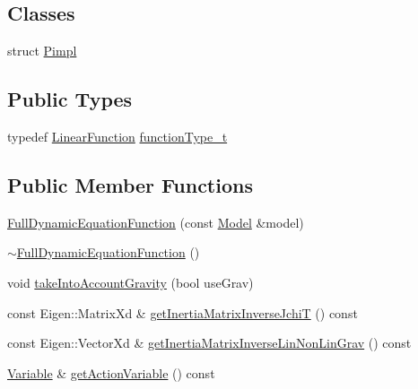\subsection*{Classes}
\begin{DoxyCompactItemize}
\item 
struct \hyperlink{structFullDynamicEquationFunction_1_1Pimpl}{Pimpl}
\end{DoxyCompactItemize}
\subsection*{Public Types}
\begin{DoxyCompactItemize}
\item 
typedef \hyperlink{classocra_1_1LinearFunction}{Linear\+Function} \hyperlink{group__constraint_ga3f72eb3c4529d2c19ef39928f5e57262}{function\+Type\+\_\+t}
\end{DoxyCompactItemize}
\subsection*{Public Member Functions}
\begin{DoxyCompactItemize}
\item 
\hyperlink{group__constraint_ga778bffa6d85a494b3ee0c499400573a6}{Full\+Dynamic\+Equation\+Function} (const \hyperlink{classocra_1_1Model}{Model} \&model)
\item 
\hyperlink{group__constraint_gab3c2d35bef3c4d8733b7ab0e9ff48bfc}{$\sim$\+Full\+Dynamic\+Equation\+Function} ()
\item 
void \hyperlink{group__constraint_ga673fd9a47a249d84ce527011a06417aa}{take\+Into\+Account\+Gravity} (bool use\+Grav)
\item 
const Eigen\+::\+Matrix\+Xd \& \hyperlink{group__constraint_gaf2529ade8eb0c03afaaed34a4e82e144}{get\+Inertia\+Matrix\+Inverse\+JchiT} () const
\item 
const Eigen\+::\+Vector\+Xd \& \hyperlink{group__constraint_ga6d0c4ebdceec4ea4569266155ca41172}{get\+Inertia\+Matrix\+Inverse\+Lin\+Non\+Lin\+Grav} () const
\item 
\hyperlink{classocra_1_1Variable}{Variable} \& \hyperlink{group__constraint_gaa3c3057ca6a00bf88c372d0c467bed67}{get\+Action\+Variable} () const
\end{DoxyCompactItemize}
